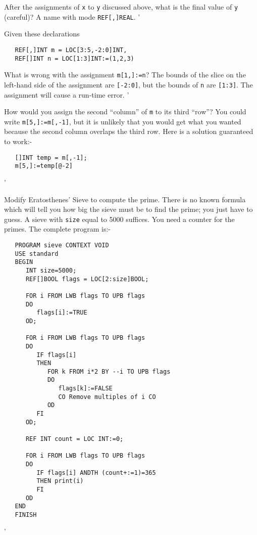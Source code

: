 \begin{exercise}
\item After the assignments of \verb|x| to \verb|y| discussed above,
what is the final value of \verb|y| (careful)? \ans A name with mode
\verb|REF[,]REAL|.
'
\item Given these declarations
\begin{verbatim}
   REF[,]INT m = LOC[3:5,-2:0]INT,
   REF[]INT n = LOC[1:3]INT:=(1,2,3)
\end{verbatim}
\indent\begin{subex}
\item What is wrong with the assignment \verb|m[1,]:=n|? \subans The
bounds of the slice on the left-hand side of the assignment are
\verb|[-2:0]|, but the bounds of \verb|n| are \verb|[1:3]|. The
assignment will cause a run-time error.
'
\item How would you assign the second ``column'' of \verb|m| to its
third ``row''? \subans You could write \verb|m[5,]:=m[,-1]|, but it
is unlikely that you would get what you wanted because the second
column overlaps the third row. Here is a solution guaranteed to work:-
\begin{verbatim}
   []INT temp = m[,-1];
   m[5,]:=temp[@-2]
\end{verbatim}
'
\end{subex}

\item Modify Eratosthenes' Sieve to compute the
 prime. \ans There is no known formula
which will tell you how big the sieve must be to find the
 prime; you just have to guess. A sieve with \verb|size|
equal to 5000 suffices. You need a counter for the primes. The
complete program is:-
\begin{verbatim}
   PROGRAM sieve CONTEXT VOID
   USE standard
   BEGIN
      INT size=5000;
      REF[]BOOL flags = LOC[2:size]BOOL;

      FOR i FROM LWB flags TO UPB flags
      DO
         flags[i]:=TRUE
      OD;

      FOR i FROM LWB flags TO UPB flags
      DO
         IF flags[i]
         THEN
            FOR k FROM i*2 BY --i TO UPB flags
            DO
               flags[k]:=FALSE
               CO Remove multiples of i CO
            OD
         FI
      OD;

      REF INT count = LOC INT:=0;

      FOR i FROM LWB flags TO UPB flags
      DO
         IF flags[i] ANDTH (count+:=1)=365
         THEN print(i)
         FI
      OD
   END
   FINISH                                     
\end{verbatim}
'
\end{exercise}

